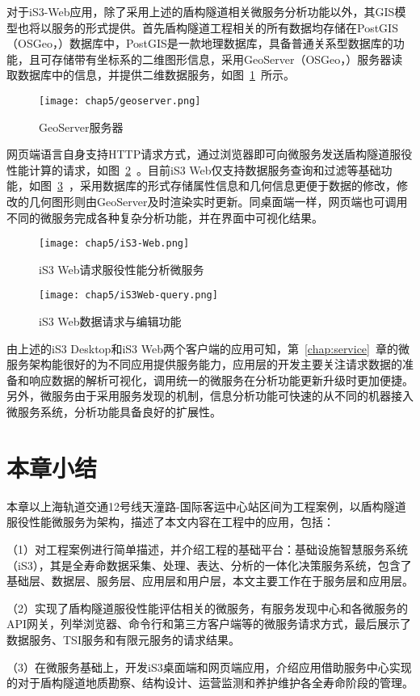 对于iS3-Web应用，除了采用上述的盾构隧道相关微服务分析功能以外，其GIS模型也将以服务的形式提供。首先盾构隧道工程相关的所有数据均存储在PostGIS（OSGeo，\citeyear{postgis2018}）数据库中，PostGIS是一款地理数据库，具备普通关系型数据库的功能，且可存储带有坐标系的二维图形信息，采用GeoServer（OSGeo，\citeyear{geoserver2018}）服务器读取数据库中的信息，并提供二维数据服务，如图~\ref{fig:GeoServer服务器}~所示。

\begin{figure}[htb!]
    \centering
    \texttt{[image: chap5/geoserver.png]}
    \caption{GeoServer服务器}
    \label{fig:GeoServer服务器}
\end{figure}

网页端语言自身支持HTTP请求方式，通过浏览器即可向微服务发送盾构隧道服役性能计算的请求，如图~\ref{fig:iS3Web请求服役性能分析微服务}~。目前iS3 Web仅支持数据服务查询和过滤等基础功能，如图~\ref{fig:iS3Web数据请求与编辑功能}~，采用数据库的形式存储属性信息和几何信息更便于数据的修改，修改的几何图形则由GeoServer及时渲染实时更新。同桌面端一样，网页端也可调用不同的微服务完成各种复杂分析功能，并在界面中可视化结果。

\begin{figure}[htb!]
    \centering
    \texttt{[image: chap5/iS3-Web.png]}
    \caption{iS3 Web请求服役性能分析微服务}
    \label{fig:iS3Web请求服役性能分析微服务}
\end{figure}

\begin{figure}[htb!]
    \centering
    \texttt{[image: chap5/iS3Web-query.png]}
    \caption{iS3 Web数据请求与编辑功能}
    \label{fig:iS3Web数据请求与编辑功能}
\end{figure}

由上述的iS3 Desktop和iS3 Web两个客户端的应用可知，第~\ref{chap:service}~章的微服务架构能很好的为不同应用提供服务能力，应用层的开发主要关注请求数据的准备和响应数据的解析可视化，调用统一的微服务在分析功能更新升级时更加便捷。另外，微服务由于采用服务发现的机制，信息分析功能可快速的从不同的机器接入微服务系统，分析功能具备良好的扩展性。

\section{本章小结}

本章以上海轨道交通12号线天潼路-国际客运中心站区间为工程案例，以盾构隧道服役性能微服务为架构，描述了本文内容在工程中的应用，包括：

（1）对工程案例进行简单描述，并介绍工程的基础平台：基础设施智慧服务系统（iS3），其是全寿命数据采集、处理、表达、分析的一体化决策服务系统，包含了基础层、数据层、服务层、应用层和用户层，本文主要工作在于服务层和应用层。

（2）实现了盾构隧道服役性能评估相关的微服务，有服务发现中心和各微服务的API网关，列举浏览器、命令行和第三方客户端等的微服务请求方式，最后展示了数据服务、TSI服务和有限元服务的请求结果。

（3）在微服务基础上，开发iS3桌面端和网页端应用，介绍应用借助服务中心实现的对于盾构隧道地质勘察、结构设计、运营监测和养护维护各全寿命阶段的管理。